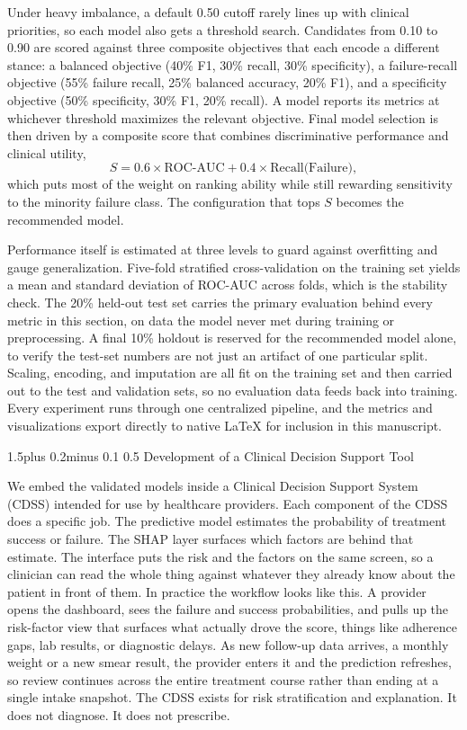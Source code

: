 \documentclass[12pt]{article}
\makeatletter
\renewcommand{\_}{\textunderscore\allowbreak}
\renewcommand{\subsection}{\@startsection{subsection}{2}{0pt}%
  {1.5\baselineskip plus 0.2\baselineskip minus 0.1\baselineskip}%
  {0.5\baselineskip}%
  {\bfseries\normalsize}}
\makeatother
\begin{document}
Under heavy imbalance, a default 0.50 cutoff rarely lines up with clinical priorities, so each model also gets a threshold search. Candidates from 0.10 to 0.90 are scored against three composite objectives that each encode a different stance: a balanced objective (40\% F1, 30\% recall, 30\% specificity), a failure-recall objective (55\% failure recall, 25\% balanced accuracy, 20\% F1), and a specificity objective (50\% specificity, 30\% F1, 20\% recall). A model reports its metrics at whichever threshold maximizes the relevant objective. Final model selection is then driven by a composite score that combines discriminative performance and clinical utility,
\[
S = 0.6 \times \text{ROC-AUC} + 0.4 \times \text{Recall(Failure)},
\]
which puts most of the weight on ranking ability while still rewarding sensitivity to the minority failure class. The configuration that tops $S$ becomes the recommended model.

Performance itself is estimated at three levels to guard against overfitting and gauge generalization. Five-fold stratified cross-validation on the training set yields a mean and standard deviation of ROC-AUC across folds, which is the stability check. The 20\% held-out test set carries the primary evaluation behind every metric in this section, on data the model never met during training or preprocessing. A final 10\% holdout is reserved for the recommended model alone, to verify the test-set numbers are not just an artifact of one particular split. Scaling, encoding, and imputation are all fit on the training set and then carried out to the test and validation sets, so no evaluation data feeds back into training. Every experiment runs through one centralized pipeline, and the metrics and visualizations export directly to native \LaTeX{} for inclusion in this manuscript.

\subsection{Development of a Clinical Decision Support Tool}

We embed the validated models inside a Clinical Decision Support System (CDSS) intended for use by healthcare providers. Each component of the CDSS does a specific job. The predictive model estimates the probability of treatment success or failure. The SHAP layer surfaces which factors are behind that estimate. The interface puts the risk and the factors on the same screen, so a clinician can read the whole thing against whatever they already know about the patient in front of them. In practice the workflow looks like this. A provider opens the dashboard, sees the failure and success probabilities, and pulls up the risk-factor view that surfaces what actually drove the score, things like adherence gaps, lab results, or diagnostic delays. As new follow-up data arrives, a monthly weight or a new smear result, the provider enters it and the prediction refreshes, so review continues across the entire treatment course rather than ending at a single intake snapshot. The CDSS exists for risk stratification and explanation. It does not diagnose. It does not prescribe.
\end{document}
